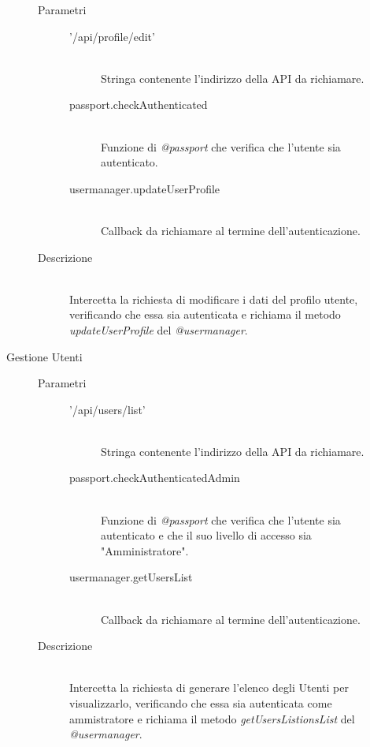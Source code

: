 \begin{description}
\begin{description}
\begin{mldescription}
    \hfill 
   \begin{description}
    \item[Parametri] \hfill
     \begin{description}
      \item['/api/profile/edit'] \hfill \\
      Stringa contenente l'indirizzo della API da richiamare.
      \item[passport.checkAuthenticated] \hfill \\
      Funzione di \textit{@passport} che verifica che l'utente sia autenticato.
      \item[usermanager.updateUserProfile] \hfill \\
      Callback da richiamare al termine dell'autenticazione.
     \end{description}
    \item[Descrizione] \hfill \\ 
   Intercetta la richiesta di modificare i dati del profilo utente, verificando che essa sia autenticata e richiama il metodo \textit{updateUserProfile} del \textit{@usermanager}.
   \end{description}
 
 \end{mldescription}  
 
 \item[Gestione Utenti] 
  \begin{mldescription}
     \hfill 
    \begin{description}
    \item[Parametri] \hfill
     \begin{description}
      \item['/api/users/list'] \hfill \\
      Stringa contenente l'indirizzo della API da richiamare.
      \item[passport.checkAuthenticatedAdmin] \hfill \\
      Funzione di \textit{@passport} che verifica che l'utente sia autenticato e che il suo livello di accesso sia "Amministratore".
      \item[usermanager.getUsersList] \hfill \\
      Callback da richiamare al termine dell'autenticazione.
     \end{description}
    \item[Descrizione] \hfill \\
    Intercetta la richiesta di generare l'elenco degli Utenti per visualizzarlo, verificando che essa sia autenticata come ammistratore e richiama il metodo \textit{getUsersListionsList} del \textit{@usermanager}.
    \end{description} 
    

\end{mldescription}
\end{description}
\end{description}
